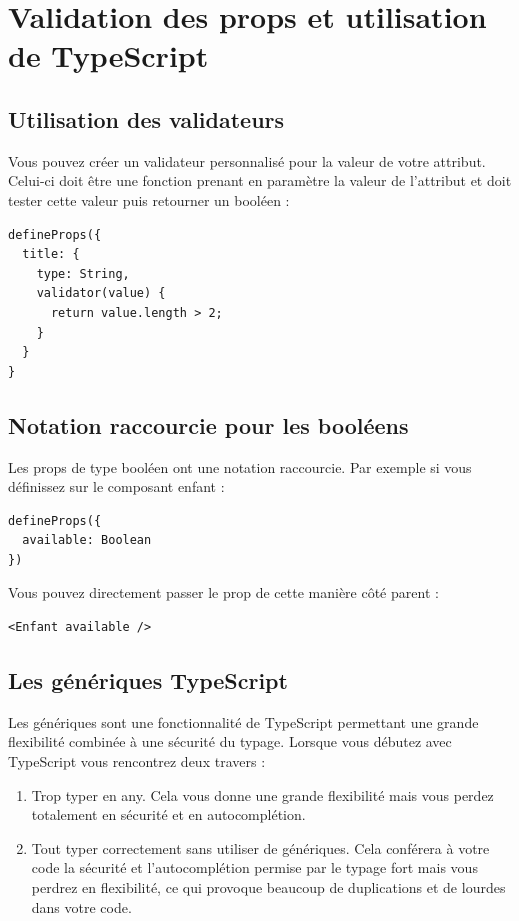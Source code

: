\documentclass{article}
\begin{document}


\section{Validation des props et utilisation de TypeScript}
\subsection{Utilisation des validateurs}
Vous pouvez créer un validateur personnalisé pour la valeur de votre attribut. Celui-ci doit être une fonction prenant en paramètre la valeur de l'attribut et doit tester cette valeur puis retourner un booléen :
\begin{verbatim}
defineProps({
  title: {
    type: String,
    validator(value) {
      return value.length > 2;
    }
  }
}
\end{verbatim}

\subsection{Notation raccourcie pour les booléens}
Les {\color{monOrange}props} de type booléen ont une notation raccourcie. Par exemple si vous définissez sur le composant enfant :
\begin{verbatim}
defineProps({
  available: Boolean
})
\end{verbatim}
Vous pouvez directement passer le {\color{monOrange}prop} de cette manière côté parent :
\begin{verbatim}
<Enfant available />
\end{verbatim}

\subsection{Les génériques TypeScript}
Les génériques sont une fonctionnalité de {\color{monOrange}TypeScript} permettant une grande flexibilité combinée à une sécurité du typage. Lorsque vous débutez avec {\color{monOrange}TypeScript} vous rencontrez deux travers :
\begin{enumerate}
\item Trop typer en {\color{monOrange}any}. Cela vous donne une grande flexibilité mais vous perdez totalement en sécurité et en autocomplétion.

\item Tout typer correctement sans utiliser de génériques. Cela conférera à votre code la sécurité et l'autocomplétion permise par le typage fort mais vous perdrez en flexibilité, ce qui provoque beaucoup de duplications et de lourdes dans votre code.
\end{enumerate}
\end{document}
